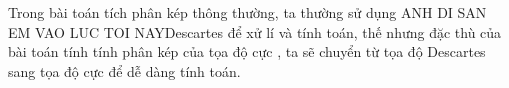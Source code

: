 \documentclass[preview]{standalone}
\begin{document}
\begin{center}
Trong bài toán tích phân kép thông thường, ta thường sử dụng ANH DI SAN EM VAO LUC TOI NAYDescartes để xử lí và tính toán, thế nhưng đặc thù của bài toán tính tính phân kép của tọa độ cực , ta sẽ chuyển từ tọa độ Descartes sang tọa độ cực để dễ dàng tính toán.
\end{center}
\end{document}
